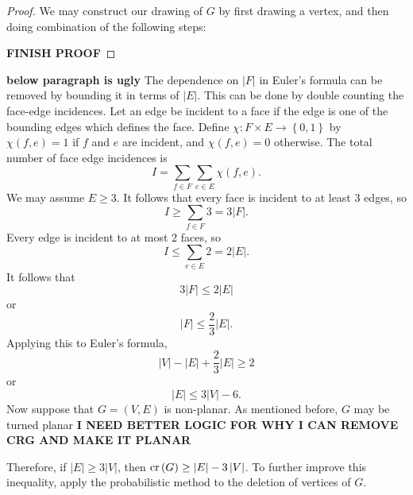 \documentclass[12pt]{amsart}
\begin{document}
\begin{proof}
We may construct our drawing of \(G\) by first drawing a vertex, and then doing combination of the following steps: 

\textbf{FINISH PROOF}
\end{proof}


\textbf{below paragraph is ugly}
The dependence on \(\left\lvert F \right\rvert \) in Euler's formula can be removed by bounding
it in terms of \(\left\lvert E \right\rvert \). This can be done by double counting the face-edge
incidences. Let an edge be incident to a face if the edge is one of the bounding
edges which defines the face. Define \(\chi : F \times E \to \left\{ 0,1 \right\} \) by
\(\chi(f,e) = 1\) if \(f\) and \(e\) are incident, and \(\chi(f,e) = 0\) otherwise.
The total number of face edge incidences is
\[
    I = \sum_{f\in F} \sum _{e \in E} \chi(f,e)
.\]
We may assume \(E \geq 3\). It follows that every face is incident to at least 3 edges,
so
\[
    I \geq \sum _{f \in F} 3 = 3 \left\lvert F \right\rvert 
.\]
Every edge is incident to at most 2 faces, so
\[
    I \leq \sum _{e \in E} 2 = 2 \left\lvert E \right\rvert 
.\]
It follows that
\[
    3 \left\lvert F \right\rvert \leq 2 \left\lvert E \right\rvert 
\]
or
\[
    \left\lvert F \right\rvert \leq \frac{2}{3} \left\lvert E \right\rvert 
.\]
Applying this to Euler's formula,
\[
    \left\lvert V \right\rvert - \left\lvert E \right\rvert + \frac{2}{3} \left\lvert E \right\rvert \geq 2
\]
or
\[
    \left\lvert E \right\rvert \leq 3 \left\lvert V \right\rvert -6
.\]
Now suppose that \(G = (V,E)\) is non-planar. As mentioned before, \(G\) may be turned planar
\textbf{I NEED BETTER LOGIC FOR WHY I CAN REMOVE CRG AND MAKE IT PLANAR}


Therefore, if \(\left\lvert E \right\rvert \geq 3 \left\lvert V \right\rvert \), then \(\operatorname{cr}\left( G \right) \geq \left\lvert E \right\rvert  - 3 \left\lvert V \right\rvert \).
To further improve this inequality, apply the probabilistic method to the deletion of vertices of \(G\).
\end{document}
